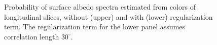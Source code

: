 \documentclass[iop,numberedappendix,apj,]{emulateapj}
\begin{document}
\begin{figure}[tbh!]
\begin{center}
    \end{center}
    \caption{Probability of surface albedo spectra estimated from colors of longitudinal slices, without (upper) and with (lower) regularization term. The regularization term for the lower panel assumes correlation length $30^{\circ }$. }
\label{fig:noreg}
\end{figure}



\end{document}

